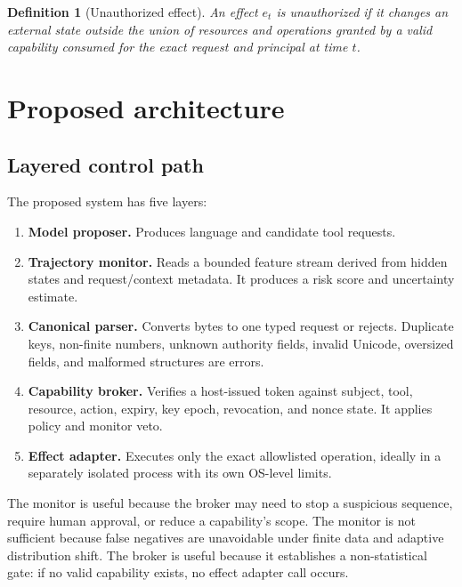 \documentclass[11pt]{article}
\newtheorem{definition}{Definition}[section]
\newcommand{\1}{\mathbf{1}}
\begin{document}
\begin{definition}[Unauthorized effect]
An effect $e_t$ is unauthorized if it changes an external state outside the union of resources and operations granted by a valid capability consumed for the exact request and principal at time $t$.
\end{definition}

\section{Proposed architecture}

\subsection{Layered control path}
The proposed system has five layers:
\begin{enumerate}
  \item \textbf{Model proposer.} Produces language and candidate tool requests.
  \item \textbf{Trajectory monitor.} Reads a bounded feature stream derived from hidden states and request/context metadata. It produces a risk score and uncertainty estimate.
  \item \textbf{Canonical parser.} Converts bytes to one typed request or rejects. Duplicate keys, non-finite numbers, unknown authority fields, invalid Unicode, oversized fields, and malformed structures are errors.
  \item \textbf{Capability broker.} Verifies a host-issued token against subject, tool, resource, action, expiry, key epoch, revocation, and nonce state. It applies policy and monitor veto.
  \item \textbf{Effect adapter.} Executes only the exact allowlisted operation, ideally in a separately isolated process with its own OS-level limits.
\end{enumerate}

The monitor is useful because the broker may need to stop a suspicious sequence, require human approval, or reduce a capability's scope. The monitor is not sufficient because false negatives are unavoidable under finite data and adaptive distribution shift. The broker is useful because it establishes a non-statistical gate: if no valid capability exists, no effect adapter call occurs.
\end{document}
